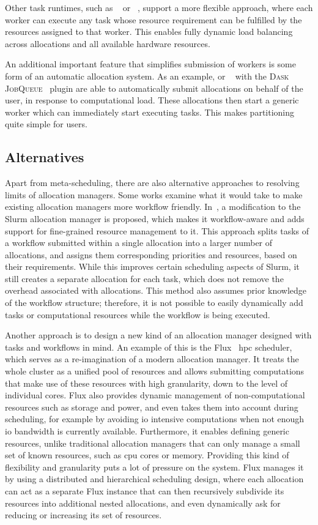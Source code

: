 Other task runtimes, such as \balsam{}~\cite{balsam} or \fireworks~\cite{fireworks}, support a
more flexible approach, where each worker can execute any task whose resource requirement can be
fulfilled by the resources assigned to that worker. This enables fully dynamic load balancing
across allocations and all available hardware resources.

An additional important feature that simplifies submission of workers is some form of an automatic
allocation system. As an example, \balsam{} or \dask{}~\cite{dask} with the
\textsc{Dask JobQueue}~\cite{dask-jobqueue} plugin are able to automatically submit allocations
on behalf of the user, in response to computational load. These allocations then start a generic
worker which can immediately start executing tasks. This makes partitioning quite simple for users.

\subsection*{Alternatives}
Apart from meta-scheduling, there are also alternative approaches to resolving limits of
allocation managers. Some works examine what it would take to make existing allocation
managers more workflow friendly. In~\cite{slurm-workflow}, a modification to the Slurm allocation
manager is proposed, which makes it workflow-aware and adds support for fine-grained resource
management to it. This approach splits tasks of a workflow submitted within a single allocation
into a larger number of allocations, and assigns them corresponding priorities and resources, based
on their requirements. While this improves certain scheduling aspects of Slurm, it still creates a
separate allocation for each task, which does not remove the overhead associated with allocations.
This method also assumes prior knowledge of the workflow structure; therefore, it is not possible
to easily dynamically add tasks or computational resources while the workflow is being executed.

Another approach is to design a new kind of an allocation manager designed with tasks and workflows
in mind. An example of this is the Flux~\cite{flux} \gls{hpc} scheduler,
which serves as a re-imagination of a modern allocation manager. It treats the whole cluster as a
unified pool of resources and allows submitting computations that make use of these resources with
high granularity, down to the level of individual cores. Flux also provides dynamic management of
non-computational resources such as storage and power, and even takes them into account during
scheduling, for example by avoiding \gls{io} intensive computations when not enough
\gls{io} bandwidth is currently available. Furthermore, it enables defining generic
resources, unlike traditional allocation managers that can only manage a small set of known
resources, such as \gls{cpu} cores or memory. Providing this kind of flexibility and
granularity puts a lot of pressure on the system. Flux manages it by using a distributed and
hierarchical scheduling design, where each allocation can act as a separate Flux instance that can
then recursively subdivide its resources into additional nested allocations, and even dynamically
ask for reducing or increasing its set of resources.

